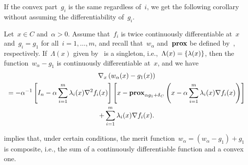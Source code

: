 \documentclass[../../main]{subfiles}
\begin{document}
If the convex part~$g_i$ is the same regardless of~$i$, we get the following corollary without assuming the differentiability of~$g_i$.
\begin{corollary} 
    Let~$x \in C$ and~$\alpha > 0$.
    Assume that~$f_i$ is twice continuously differentiable at~$x$ and~$g_i = g_1$ for all~$i = 1, \dots, m$, and recall that~$w_\alpha$ and~$\prox$ be defined by~, respectively.
    If~$\Lambda(x)$ given by~ is a singleton, i.e.,~$\Lambda(x) = \set*{\lambda(x)}$, then the function~$w_\alpha - g_1$ is continuously differentiable at~$x$, and we have
    \begin{multline}
        \nabla_x \left( w_\alpha(x) - g_1(x) \right) \\
        = - \alpha^{-1} \left[ I_n - \alpha \sum_{i = 1}^{m} \lambda_i(x) \nabla^2 f_i(x) \right] \left[x - \prox_{\alpha g_1 + \indicator_C} \left( x - \alpha \sum_{i = 1}^{m} \lambda_i(x) \nabla f_i(x) \right) \right] \\
        + \sum_{i = 1}^{m} \lambda_i(x) \nabla f_i(x)
        .\end{multline}
\end{corollary}
 implies that, under certain conditions, the merit function~$w_\alpha = (w_\alpha - g_1) + g_1$ is composite, i.e., the sum of a continuously differentiable function and a convex one.
\end{document}

